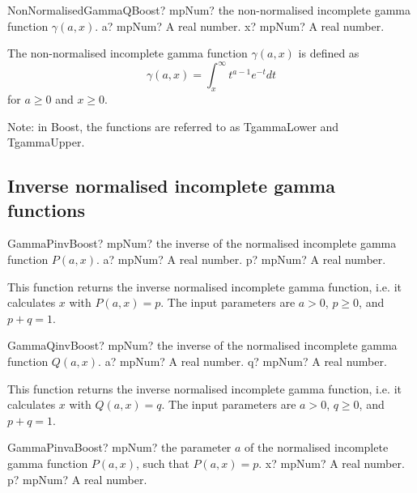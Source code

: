 \vspace{0.6cm}
\begin{mpFunctionsExtract}
	\mpFunctionTwo
	{NonNormalisedGammaQBoost? mpNum? the non-normalised incomplete gamma function $\gamma(a,x)$.}
	{a? mpNum? A real number.}
	{x? mpNum? A real number.}
\end{mpFunctionsExtract}

\vspace{0.3cm}
The non-normalised incomplete gamma function $\gamma(a,x)$ is defined as
\begin{equation}
	\gamma(a,x)= \int_x^{\infty} t^{a-1} e^{-t}dt
\end{equation}
for $a \geq 0$ and $x \geq 0$.


Note: in Boost, the functions are referred to as TgammaLower and TgammaUpper.


\subsection{Inverse normalised incomplete gamma functions}

\begin{mpFunctionsExtract}
	\mpFunctionTwo
	{GammaPinvBoost? mpNum? the inverse of the normalised incomplete gamma function $P(a,x)$.}
	{a? mpNum? A real number.}
	{p? mpNum? A real number.}
\end{mpFunctionsExtract}

\vspace{0.3cm}
This function returns the inverse normalised incomplete gamma function, i.e. it calculates $x$ with $P(a,x) = p$. The input parameters are $a>0$, $p \geq 0$,  and $p+q=1$. 

\vspace{0.6cm}
\begin{mpFunctionsExtract}
	\mpFunctionTwo
	{GammaQinvBoost? mpNum? the inverse of the normalised incomplete gamma function $Q(a,x)$.}
	{a? mpNum? A real number.}
	{q? mpNum? A real number.}
\end{mpFunctionsExtract}


\vspace{0.3cm}
This function returns the inverse normalised incomplete gamma function, i.e. it calculates $x$ with $Q(a,x) = q$. The input parameters are $a>0$, $q \geq 0$, and $p+q=1$. 

\vspace{0.6cm}
\begin{mpFunctionsExtract}
	\mpFunctionTwo
	{GammaPinvaBoost? mpNum? the parameter $a$ of the normalised incomplete gamma function $P(a,x)$, such that $P(a,x) = p$.}
	{x? mpNum? A real number.}
	{p? mpNum? A real number.}
\end{mpFunctionsExtract}


